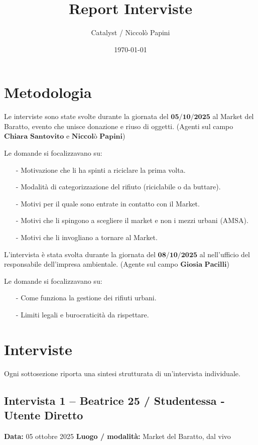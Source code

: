 \documentclass[12pt,a4paper]{article}
\title{Report Interviste}
\author{Catalyst / Niccolò Papini}
\date{\today}
\begin{document}
\maketitle
\tableofcontents
\newpage

\section{Metodologia}
Le interviste sono state svolte durante la giornata del $\textbf{05/10/2025}$ al Market del Baratto, evento che unisce donazione e riuso di oggetti. (Agenti sul campo $\textbf{Chiara Santovito}$ e $\textbf{Niccolò Papini}$) 

Le domande si focalizzavano su:
\begin{itemize}
  \item [-] Motivazione che li ha spinti a riciclare la prima volta.
  \item [-] Modalità di categorizzazione del rifiuto (riciclabile o da buttare).
  \item [-] Motivi per il quale sono entrate in contatto con il Market.
  \item [-] Motivi che li spingono a scegliere il market e non i mezzi urbani (AMSA).
  \item [-] Motivi che li invogliano a tornare al Market.
\end{itemize}

L'intervista è stata svolta durante la giornata del $\textbf{08/10/2025}$ al nell'ufficio del responsabile dell'impresa ambientale. (Agente sul campo $\textbf{Giosia Pacilli}$) 

Le domande si focalizzavano su:
\begin{itemize}
  \item [-] Come funziona la gestione dei rifiuti urbani.
  \item [-] Limiti legali e burocraticità da rispettare.
\end{itemize}

\newpage


\section{Interviste}
Ogni sottosezione riporta una sintesi strutturata di un'intervista individuale.

\subsection{Intervista 1 – Beatrice 25 / Studentessa - Utente Diretto}
\textbf{Data:} 05 ottobre 2025  
\textbf{Luogo / modalità:} Market del Baratto, dal vivo  
\end{document}
